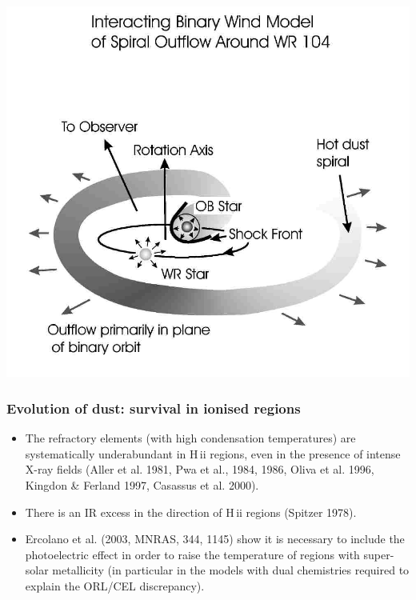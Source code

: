 \begin{frame}
\begin{minipage}[t]{0.44\textwidth}
\begin{center}
\includegraphics[width=\textwidth,height=!]{./D/WR104_mod.jpg}
\end{center}
\end{minipage}


\end{frame}
\begin{frame}\frametitle{ Evolution of dust:
survival in ionised regions}

\begin{itemize}

\item The refractory elements (with high condensation temperatures)
are systematically underabundant in H\,{\sc ii} regions, even in the
presence of intense X-ray fields (Aller et al. 1981, Pwa et al., 1984,
1986, Oliva et al. 1996, Kingdon \& Ferland 1997, Casassus et
al. 2000).

\item There is an IR excess in the direction of H\,{\sc ii} regions
  (Spitzer 1978). 

\item Ercolano et al. (2003, MNRAS, 344, 1145) show it is necessary to
include the photoelectric effect in order to raise the temperature of
regions with super-solar metallicity (in particular in the models with
dual chemistries required to explain the ORL/CEL discrepancy).

\end{itemize}

\end{frame}
